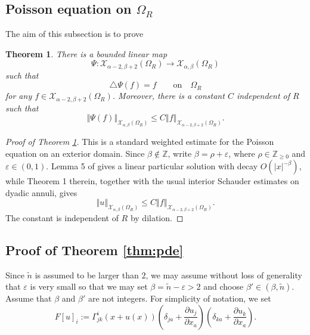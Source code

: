 \documentclass{amsart}
\newtheorem{thm}{Theorem}[section]
\newcommand{\norm}[1]{\left\Vert#1\right\Vert}
\newcommand{\abs}[1]{\left\vert#1\right\vert}
\newcommand{\pfrac}[2]{\frac{\partial #1}{\partial #2}}
\numberwithin{equation}{section}
\begin{document}
\subsection{Poisson equation on $\Omega_R$}
\label{sub:poisson}

The aim of this subsection is to prove
\begin{thm}
	\label{thm:linear} 
	There is a bounded linear map
	\[
		\Psi: \mathcal X_{\alpha-2,\beta+2}(\Omega_R) \to \mathcal X_{\alpha,\beta}(\Omega_R)
	\]
	such that
	\[
		\triangle \Psi(f) = f \qquad \text{on} \quad \Omega_R
	\]
	for any $f\in \mathcal X_{\alpha-2,\beta+2}(\Omega_R)$. Moreover, there is a constant $C$ independent of $R$ such that
	\[
		\norm{\Psi(f)}_{\mathcal X_{\alpha,\beta}(\Omega_R)}\leq C \norm{f}_{\mathcal X_{\alpha-2,\beta+2}(\Omega_R)}.
	\]
\end{thm}

\begin{proof}[Proof of Theorem \ref{thm:linear}]
	This is a standard weighted estimate for the Poisson equation on an exterior domain. Since $\beta\notin\mathbb Z$, write $\beta=\rho+\varepsilon$, where $\rho\in\mathbb Z_{\geq 0}$ and $\varepsilon\in(0,1)$. Lemma 5 of \cite{meyers1963} gives a linear particular solution with decay $O(\abs{x}^{-\beta})$, while Theorem 1 therein, together with the usual interior Schauder estimates on dyadic annuli, gives
	\[
		\norm{u}_{\mathcal X_{\alpha,\beta}(\Omega_R)}
		\leq C
		\norm{f}_{\mathcal X_{\alpha-2,\beta+2}(\Omega_R)}.
	\]
	The constant is independent of $R$ by dilation.
\end{proof}


\subsection{Proof of Theorem \ref{thm:pde}}


Since $\tilde{n}$ is assumed to be larger than $2$, we may assume without loss of generality that $\varepsilon$ is very small so that we may set $\beta=\tilde{n}-\varepsilon>2$ and choose $\beta'\in (\beta,\tilde{n})$. Assume that $\beta$ and $\beta'$ are not integers. 
For simplicity of notation, we set
\[
	F[u]_i:= \Gamma^i_{jk}(x+u(x)) \left( \delta_{ja}+\pfrac{u_j}{x_a} \right)\left( \delta_{ka}+\pfrac{u_k}{x_a} \right).
\]
\end{document}
